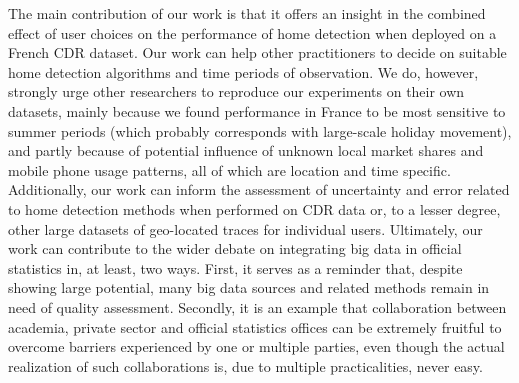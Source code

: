 \documentclass[a4paper]{article}
\begin{document}
The main contribution of our work is that it offers an insight in the combined effect of user choices on the performance of home detection when deployed on a French CDR dataset. Our work can help other practitioners to decide on suitable home detection algorithms and time periods of observation. We do, however, strongly urge other researchers to reproduce our experiments on their own datasets, mainly because we found performance in France to be most sensitive to summer periods (which probably corresponds with large-scale holiday movement), and partly because of potential influence of unknown local market shares and mobile phone usage patterns, all of which are location and time specific. Additionally, our work can inform the assessment of uncertainty and error related to home detection methods when performed on CDR data or, to a lesser degree, other large datasets of geo-located traces for individual users. Ultimately, our work can contribute to the wider debate on integrating big data in official statistics in, at least, two ways. First, it serves as a reminder that, despite showing large potential, many big data sources and related methods remain in need of quality assessment. Secondly, it is an example that collaboration between academia, private sector and official statistics offices can be extremely fruitful to overcome barriers experienced by one or multiple parties, even though the actual realization of such collaborations is, due to multiple practicalities, never easy.  

\clearpage



\end{document}
